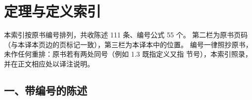 \chapter{定理与定义索引}
\label{app:index}

本索引按原书编号排列，共收陈述 111 条、编号公式 55 个。
第二栏为原书页码（与本译本页边的页标记一致），第三栏为本译本中的位置。
编号一律照抄原书，未作任何重排：原书若有两处同号（例如 1.3 既指定义又指
节号），本索引照录，并在正文相应处以译注说明。

\section*{一、带编号的陈述}

